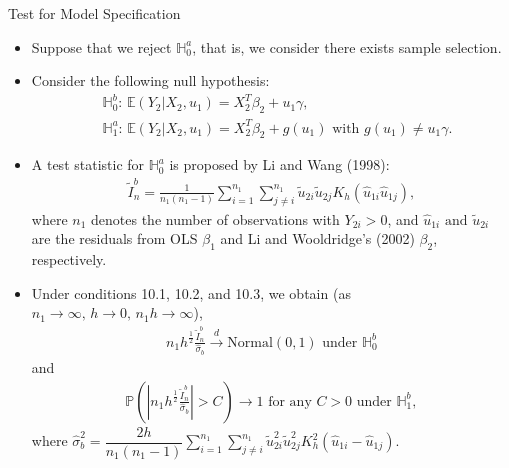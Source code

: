 \documentclass[xcolor=svgnames,dvipdfmx,cjk]{beamer}
\theoremstyle{example}
\def\E{\mathbb{E}}
\def\H{\mathbb{H}}
\def\P{\mathbb{P}}
\def\darrow{\xrightarrow{d}}
\begin{document}
\begin{frame}{Test for Model Specification}
      \begin{itemize}
            \item Suppose that we reject $\H_0^a$, that is, we consider there exists sample selection.
            \item Consider the following null hypothesis:
                  \begin{align*}
                        &\H_{0}^b: \, \E(Y_2|X_2, u_1) = X_2^T \beta_2 + u_1 \gamma, \\
                        &\H_{1}^a: \, \E(Y_2|X_2, u_1) = X_2^T \beta_2 + g(u_1) \text{ with } g(u_1) \neq u_1 \gamma.
                  \end{align*}
            \item A test statistic for $\H_{0}^a$ is proposed 
                  by Li and Wang (1998):
                  \begin{align*}
                        \tilde{I}_n^b 
                              = \frac{1}{n_1 (n_1 - 1)}
                                \sum_{i=1}^{n_1} \sum_{j \neq i}^{n_1}
                                \tilde{u}_{2i} \tilde{u}_{2j} K_h (\hat{u}_{1i} \hat{u}_{1j}),
                  \end{align*}
                  where $n_1$ denotes the number of observations with $Y_{2i} > 0$, and 
                  $\hat{u}_{1i} \text{ and } \tilde{u}_{2i}$ are the residuals 
                  from OLS $\beta_1$ and Li and Wooldridge's (2002) $\beta_2$, respectively.
      \end{itemize}
\end{frame}

\begin{frame}
      \begin{itemize}
            \item Under conditions 10.1, 10.2, and 10.3, we obtain 
                  (as $n_1 \to \infty, \, h \to 0,\, n_1 h \to \infty$),
                  \begin{align*}
                        n_1 h^{\frac{1}{2}}\frac{\tilde{I}_n^b}{\hat{\sigma}_b} \darrow \text{Normal} (0,1) \text{ under } \H_{0}^b
                  \end{align*}
                  and 
                  \begin{align*}
                        \P \left(
                              \left|
                                    n_1 h^{\frac{1}{2}}\frac{\tilde{I}_n^b}{\hat{\sigma}_b}  
                              \right| > C
                        \right) \to 1 \text{ for any } C>0 \text{ under } \H_{1}^b,
                  \end{align*}
                  where $\hat{\sigma}_b^2 
                              = \dfrac{2h}{n_1(n_1 - 1)}
                                \sum_{i=1}^{n_1} \sum_{j \neq i}^{n_1}
                                \tilde{u}_{2i}^2 \tilde{u}_{2j}^2 K_h^2 (\hat{u}_{1i} - \hat{u}_{1j})$.
      \end{itemize}
\end{frame}
\end{document}
